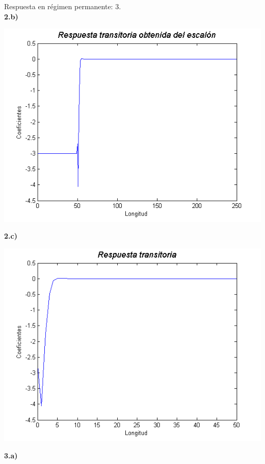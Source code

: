 \documentclass[a4paper,12pt]{article}
\begin{document}
Respuesta en régimen permanente: 3.\\



\textbf{2.b)} \\

\begin{center}
\includegraphics[width=.8 \textwidth]{ejercicio-4-5-b.png}
\end{center}



\textbf{2.c)} \\

\begin{center}
\includegraphics[width=.8 \textwidth]{ejercicio-4-5-c.png}
\end{center}



\textbf{3.a)} \\
\end{document}
